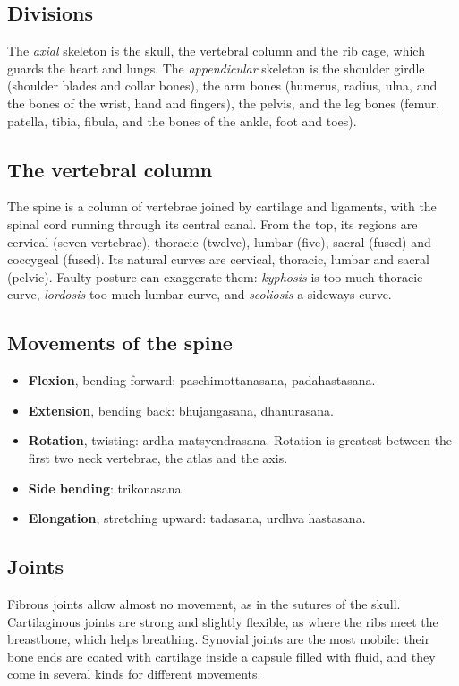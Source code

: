 \subsection*{Divisions}
The \emph{axial} skeleton is the skull, the vertebral column and the rib cage, which guards the heart and lungs. The \emph{appendicular} skeleton is the shoulder girdle (shoulder blades and collar bones), the arm bones (humerus, radius, ulna, and the bones of the wrist, hand and fingers), the pelvis, and the leg bones (femur, patella, tibia, fibula, and the bones of the ankle, foot and toes).


\subsection*{The vertebral column}
The spine is a column of vertebrae joined by cartilage and ligaments, with the spinal cord running through its central canal. From the top, its regions are cervical (seven vertebrae), thoracic (twelve), lumbar (five), sacral (fused) and coccygeal (fused). Its natural curves are cervical, thoracic, lumbar and sacral (pelvic). Faulty posture can exaggerate them: \emph{kyphosis} is too much thoracic curve, \emph{lordosis} too much lumbar curve, and \emph{scoliosis} a sideways curve.


\subsection*{Movements of the spine}
\begin{itemize}
\item \textbf{Flexion}, bending forward: paschimottanasana, padahastasana.
\item \textbf{Extension}, bending back: bhujangasana, dhanurasana.
\item \textbf{Rotation}, twisting: ardha matsyendrasana. Rotation is greatest between the first two neck vertebrae, the atlas and the axis.
\item \textbf{Side bending}: trikonasana.
\item \textbf{Elongation}, stretching upward: tadasana, urdhva hastasana.
\end{itemize}


\subsection*{Joints}
Fibrous joints allow almost no movement, as in the sutures of the skull. Cartilaginous joints are strong and slightly flexible, as where the ribs meet the breastbone, which helps breathing. Synovial joints are the most mobile: their bone ends are coated with cartilage inside a capsule filled with fluid, and they come in several kinds for different movements.

